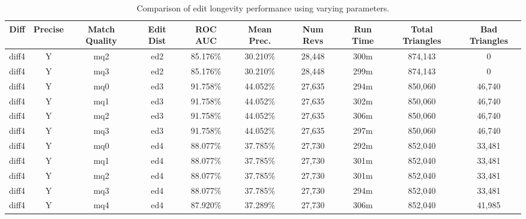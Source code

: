 \begin{sidewaystable}[!tp]
  \begin{center}
    \begin{tabular}{|c|c|c|c||c|c||c|c|c|c|}
\hline
Diff & Precise & Match Quality & Edit Dist
        & ROC AUC & Mean Prec.
        & Num Revs & Run Time
        & Total Triangles & Bad Triangles \\
\hline
\hline
diff4 & Y & mq2 & ed2 & 85.176\% & 30.210\% & 28,448 & 300m & 874,143 & 0 \\
diff4 & Y & mq3 & ed2 & 85.176\% & 30.210\% & 28,448 & 299m & 874,143 & 0 \\
diff4 & Y & mq0 & ed3 & 91.758\% & 44.052\% & 27,635 & 294m & 850,060 & 46,740 \\
diff4 & Y & mq1 & ed3 & 91.758\% & 44.052\% & 27,635 & 302m & 850,060 & 46,740 \\
diff4 & Y & mq2 & ed3 & 91.758\% & 44.052\% & 27,635 & 306m & 850,060 & 46,740 \\
diff4 & Y & mq3 & ed3 & 91.758\% & 44.052\% & 27,635 & 297m & 850,060 & 46,740 \\
diff4 & Y & mq0 & ed4 & 88.077\% & 37.785\% & 27,730 & 292m & 852,040 & 33,481 \\
diff4 & Y & mq1 & ed4 & 88.077\% & 37.785\% & 27,730 & 301m & 852,040 & 33,481 \\
diff4 & Y & mq2 & ed4 & 88.077\% & 37.785\% & 27,730 & 301m & 852,040 & 33,481 \\
diff4 & Y & mq3 & ed4 & 88.077\% & 37.785\% & 27,730 & 294m & 852,040 & 33,481 \\
diff4 & Y & mq4 & ed4 & 87.920\% & 37.289\% & 27,730 & 306m & 852,040 & 41,985 \\
\hline
\end{tabular}
\end{center}
\caption{Comparison of edit longevity performance using
    varying parameters.}
\end{sidewaystable}


